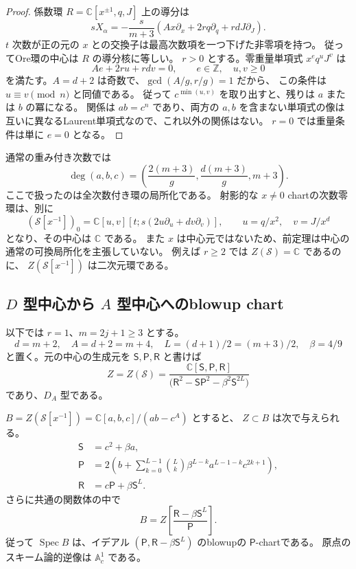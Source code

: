 \begin{proof}
係数環 $R=\mathbb C[x^{\pm1},q,J]$ 上の導分は
\[
 sX_\alpha=-\frac{s}{m+3}
       (Ax\partial_x+2r q\partial_q+rdJ\partial_J).
\]
$t$ 次数が正の元の $x$ との交換子は最高次数項を一つ下げた非零項を持つ。
従ってOre環の中心は $R$ の導分核に等しい。
$r>0$ とする。零重量単項式 $x^e q^uJ^v$ は
\[
 Ae+2ru+rdv=0,\qquad e\in\mathbb Z,\quad u,v\ge0
\]
を満たす。$A=d+2$ は奇数で、$\gcd(A/g,r/g)=1$ だから、
この条件は $u\equiv v\pmod n$ と同値である。
従って $c^{\min(u,v)}$ を取り出すと、残りは $a$ または $b$ の冪になる。
関係は $ab=c^n$ であり、両方の $a,b$ を含まない単項式の像は
互いに異なるLaurent単項式なので、これ以外の関係はない。
$r=0$ では重量条件は単に $e=0$ となる。
\end{proof}

通常の重み付き次数では
\[
 \deg(a,b,c)=\left(\frac{2(m+3)}g,
                    \frac{d(m+3)}g,m+3\right).
\]
ここで扱ったのは全次数付き環の局所化である。
射影的な $x\ne0$ chartの次数零環は、別に
\[
 (\mathcal S[x^{-1}])_0
 =\mathbb C[u,v][t;s(2u\partial_u+dv\partial_v)],
 \qquad u=q/x^2,\quad v=J/x^d
\]
となり、その中心は $\mathbb C$ である。
また $x$ は中心元ではないため、前定理は中心の通常の可換局所化を主張していない。
例えば $r\ge2$ では $Z(\mathcal S)=\mathbb C$ であるのに、
$Z(\mathcal S[x^{-1}])$ は二次元環である。

\subsection{$D$ 型中心から $A$ 型中心へのblowup chart}

以下では $r=1$、$m=2j+1\ge3$ とする。
\[
 d=m+2,\quad A=d+2=m+4,\quad
 L=(d+1)/2=(m+3)/2,\quad \beta=4/9
\]
と置く。元の中心の生成元を $\mathsf S,\mathsf P,\mathsf R$ と書けば
\[
 Z=Z(\mathcal S)
 =\frac{\mathbb C[\mathsf S,\mathsf P,\mathsf R]}
 {\bigl(\mathsf R^2-\mathsf S\mathsf P^2-\beta^2\mathsf S^{2L}\bigr)}
\]
であり、$D_A$ 型である。

\begin{proposition}[中心間の明示的な双有理射]
\label{prop:blowup-chart-v35}
$B=Z(\mathcal S[x^{-1}])=\mathbb C[a,b,c]/(ab-c^A)$ とすると、
$Z\subset B$ は次で与えられる。
\begin{align*}
 \mathsf S&=c^2+\beta a,\\
 \mathsf P&=2\left(b+
   \sum_{k=0}^{L-1}\binom Lk\beta^{L-k}
                   a^{L-1-k}c^{2k+1}\right),\\
 \mathsf R&=c\mathsf P+\beta\mathsf S^L.
\end{align*}
さらに共通の関数体の中で
\[
 \boxed{
 B=Z\left[\frac{\mathsf R-\beta\mathsf S^L}{\mathsf P}\right].
 }
\]
従って $\operatorname{Spec}B$ は、イデアル
$(\mathsf P,\mathsf R-\beta\mathsf S^L)$ のblowupの $\mathsf P$-chartである。
原点のスキーム論的逆像は $\mathbb A^1_c$ である。
\end{proposition}

